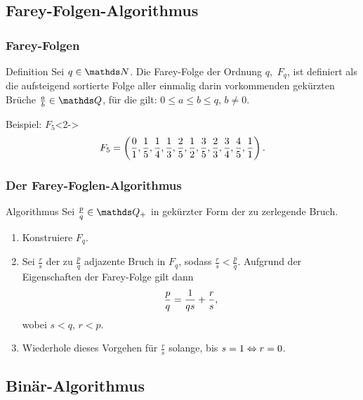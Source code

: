 \documentclass{beamer}
\begin{document}

\subsection{Farey-Folgen-Algorithmus}

\begin{frame}
\frametitle{Farey-Folgen}
	\begin{block}{Definition}
	Sei $q \in \N$. Die Farey-Folge der Ordnung $q$, $\, F_q$, ist definiert als die aufsteigend sortierte Folge aller einmalig darin vorkommenden gekürzten Brüche $\frac{a}{b} \in \Q$, für die gilt:
	$0\leq a \leq b \leq q,\, b\neq 0$.
	\end{block}
	\hspace{5cm}
	\begin{block}{Beispiel: $F_5$}<2->
		$$F_5 = \left(\frac{0}{1}, \frac{1}{5}, \frac{1}{4}, \frac{1}{3}, \frac{2}{5}, \frac{1}{2}, \frac{3}{5}, \frac{2}{3}, \frac{3}{4}, \frac{4}{5}, \frac{1}{1} \right).$$
	\end{block}
\end{frame}

\begin{frame}
	\frametitle{Der Farey-Foglen-Algorithmus}
	\begin{block}{Algorithmus}
		Sei $\frac{p}{q} \in \Q_+$ in gekürzter Form der zu zerlegende Bruch.\\
		\begin{enumerate}
			\item Konstruiere $F_q$.
			\item Sei $\frac{r}{s}$ der zu $\frac{p}{q}$ adjazente Bruch in $F_q$, sodass $\frac{r}{s} < \frac{p}{q}$. Aufgrund der Eigenschaften der Farey-Folge gilt dann
			$$\frac{p}{q} = \frac{1}{qs} + \frac{r}{s},$$ wobei $s<q,\, r<p$.
			\item Wiederhole dieses Vorgehen für $\frac{r}{s}$ solange, bis $s=1 \Leftrightarrow r=0$.
		\end{enumerate}
	\end{block}
\end{frame}


\subsection{Binär-Algorithmus}
\end{document}
